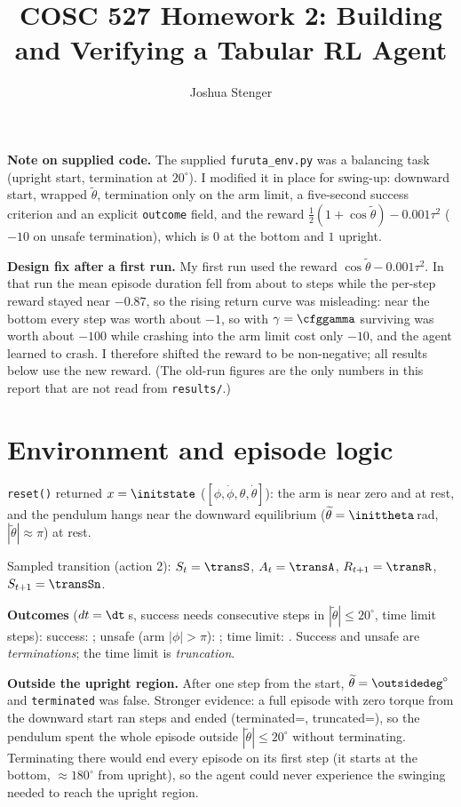 \documentclass[11pt]{article}
\title{COSC 527 Homework 2: Building and Verifying a Tabular RL Agent}
\author{Joshua Stenger}
\date{}
\begin{document}
\maketitle

\noindent\textbf{Note on supplied code.} The supplied \texttt{furuta\_env.py} was a balancing task (upright start, termination at $20^\circ$). I modified it in place for swing-up: downward start, wrapped $\widetilde\theta$, termination only on the arm limit, a five-second success criterion and an explicit \texttt{outcome} field, and the reward $\tfrac12(1+\cos\widetilde\theta)-0.001\tau^2$ ($-10$ on unsafe termination), which is $0$ at the bottom and $1$ upright.

\noindent\textbf{Design fix after a first run.} My first run used the reward $\cos\widetilde\theta-0.001\tau^2$. In that run the mean episode duration fell from about \oldDurFrom{} to \oldDurTo{} steps while the per-step reward stayed near $-0.87$, so the rising return curve was misleading: near the bottom every step was worth about $-1$, so with $\gamma=\cfggamma$ surviving was worth about $-100$ while crashing into the arm limit cost only $-10$, and the agent learned to crash. I therefore shifted the reward to be non-negative; all results below use the new reward. (The old-run figures are the only numbers in this report that are not read from \texttt{results/}.)

\section{Environment and episode logic}
\texttt{reset()} returned $x=\initstate$ ($[\phi,\dot\phi,\theta,\dot\theta]$): the arm is near zero and at rest, and the pendulum hangs near the downward equilibrium ($\widetilde\theta=\inittheta$\,rad, $|\widetilde\theta|\approx\pi$) at rest.
\begin{center}\end{center}
Sampled transition (action 2): $S_t=\transS$, $A_t=\transA$, $R_{t+1}=\transR$, $S_{t+1}=\transSn$.

\textbf{Outcomes} ($dt=\dt$\,s, success needs \successsteps{} consecutive steps in $|\widetilde\theta|\le20^\circ$, time limit \maxsteps{} steps): success: \outsuccess; unsafe (arm $|\phi|>\pi$): \outunsafe; time limit: \outtimeout. Success and unsafe are \emph{terminations}; the time limit is \emph{truncation}.

\textbf{Outside the upright region.} After one step from the start, $\widetilde\theta=\outsidedeg^\circ$ and \texttt{terminated} was false. Stronger evidence: a full episode with zero torque from the downward start ran \zeroSteps{} steps and ended \zeroOutcome{} (terminated=\zeroTerm, truncated=\zeroTrunc), so the pendulum spent the whole episode outside $|\widetilde\theta|\le20^\circ$ without terminating. Terminating there would end every episode on its first step (it starts at the bottom, $\approx180^\circ$ from upright), so the agent could never experience the swinging needed to reach the upright region.
\end{document}
